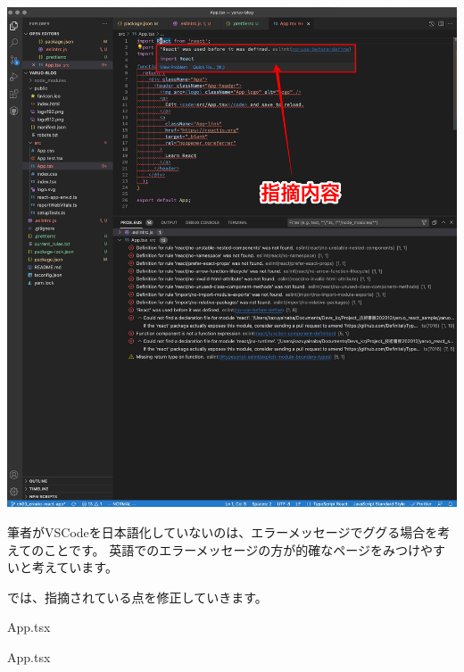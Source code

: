 \begin{reviewimage}[H]%
\includegraphics[width=1.0\maxwidth]{./images/02-create-react-app/04_eslint_prettier_fix.png}%
\label{image:02-create-react-app:04_eslint_prettier_fix}
\end{reviewimage}
\begin{starternote}[]{}

筆者がVSCodeを日本語化していないのは、エラーメッセージでググる場合を考えてのことです。
英語でのエラーメッセージの方が的確なページをみつけやすいと考えています。

\end{starternote}

では、指摘されている点を修正していきます。

\def\startercodeblockfontsize{}
\begin{starterprogram}[]{App.tsx}\end{starterprogram}
\def\startercodeblockfontsize{}
\begin{starterprogram}[]{App.tsx}\end{starterprogram}

